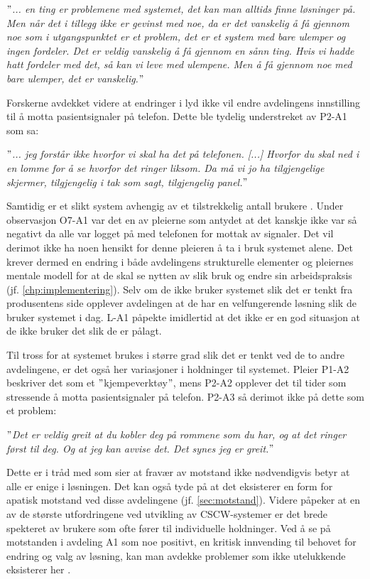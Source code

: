 \noindent
\textit{$"$... en ting er problemene med systemet, det kan man alltids finne løsninger på. Men når det i tillegg ikke er gevinst med noe, da er det vanskelig å få gjennom noe som i utgangspunktet er et problem, det er et system med bare ulemper og ingen fordeler. Det er veldig vanskelig å få gjennom en sånn ting. Hvis vi hadde hatt fordeler med det, så kan vi leve med ulempene. Men å få gjennom noe med bare ulemper, det er vanskelig.$"$}

\noindent
Forskerne avdekket videre at endringer i lyd ikke vil endre avdelingens innstilling til å motta pasientsignaler på telefon. Dette ble tydelig understreket av P2-A1 som sa:

\noindent
\textit{$"$... jeg forstår ikke hvorfor vi skal ha det på telefonen. [...] Hvorfor du skal ned i en lomme for å se hvorfor det ringer liksom. Da må vi jo ha tilgjengelige skjermer, tilgjengelig i tak som sagt, tilgjengelig panel.$"$}

\noindent
Samtidig er et slikt system avhengig av et tilstrekkelig antall brukere \citep{Ackerman00}. Under observasjon O7-A1 var det en av pleierne som antydet at det kanskje ikke var så negativt da alle var logget på med telefonen for mottak av signaler. Det vil derimot ikke ha noen hensikt for denne pleieren å ta i bruk systemet alene. Det krever dermed en endring i både avdelingens strukturelle elementer og pleiernes mentale modell for at de skal se nytten av slik bruk og endre sin arbeidspraksis (jf. \ref{chp:implementering}). Selv om de ikke bruker systemet slik det er tenkt fra produsentens side opplever avdelingen at de har en velfungerende løsning slik de bruker systemet i dag. L-A1 påpekte imidlertid at det ikke er en god situasjon at de ikke bruker det slik de er pålagt. 

\noindent
Til tross for at systemet brukes i større grad slik det er tenkt ved de to andre avdelingene, er det også her variasjoner i holdninger til systemet. Pleier P1-A2 beskriver det som et $"$kjempeverktøy$"$, mens P2-A2 opplever det til tider som stressende å motta pasientsignaler på telefon. P2-A3 så derimot ikke på dette som et problem: 

\noindent
\textit{$"$Det er veldig greit at du kobler deg på rommene som du har, og at det ringer først til deg. Og at jeg kan avvise det. Det synes jeg er greit.$"$}

\noindent
Dette er i tråd med \citet{Jacobsen12} som sier at fravær av motstand ikke nødvendigvis betyr at alle er enige i løsningen. Det kan også tyde på at det eksisterer en form for apatisk motstand ved disse avdelingene (jf. \ref{sec:motstand}). Videre påpeker \citet{Berg99} at en av de største utfordringene ved utvikling av CSCW-systemer er det brede spekteret av brukere som ofte fører til individuelle holdninger. Ved å se på motstanden i avdeling A1 som noe positivt, en kritisk innvending til behovet for endring og valg av løsning, kan man avdekke problemer som ikke utelukkende eksisterer her \citep{Jacobsen12}.

